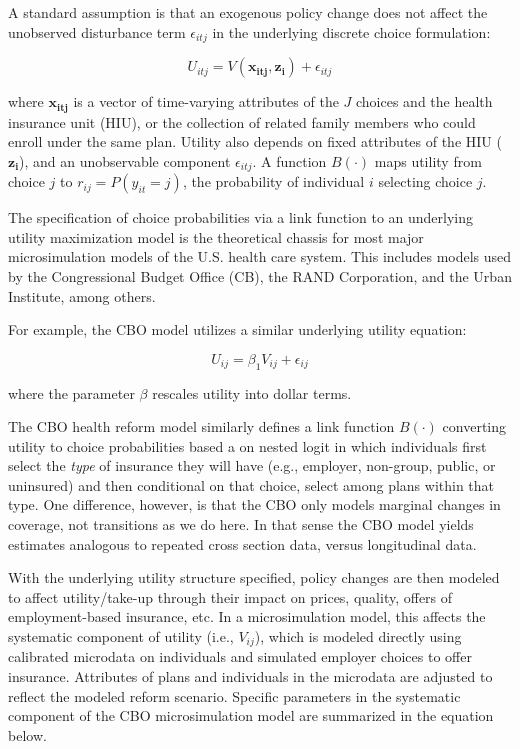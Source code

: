 \documentclass[
  10pt,
]{article}
\begin{document}
A standard assumption is that an exogenous policy change does not affect
the unobserved disturbance term \(\epsilon_{itj}\) in the underlying
discrete choice formulation:

\begin{equation}
\label{eq:utility_1}
U_{itj} = V(\mathbf{x_{itj}}, \mathbf{z_i})+ \epsilon_{itj}
\end{equation}

\noindent where \(\mathbf{x_{itj}}\) is a vector of time-varying
attributes of the \(J\) choices and the health insurance unit (HIU), or
the collection of related family members who could enroll under the same
plan. Utility also depends on fixed attributes of the HIU
(\(\mathbf{z_i}\)), and an unobservable component \(\epsilon_{itj}\). A
function \(B(\cdot)\) maps utility from choice \(j\) to
\(r_{ij} = P(y_{it} = j)\), the probability of individual \(i\)
selecting choice \(j\).

The specification of choice probabilities via a link function to an
underlying utility maximization model is the theoretical chassis for
most major microsimulation models of the U.S. health care system. This
includes models used by the Congressional Budget Office (CB), the RAND
Corporation, and the Urban Institute, among others.

For example, the CBO model utilizes a similar underlying utility
equation:

\begin{equation}
\label{eq:utility_cbo}
U_{ij} = \beta_1 V_{ij} + \epsilon_{ij}
\end{equation}

\noindent where the parameter \(\beta\) rescales utility into dollar
terms.

The CBO health reform model similarly defines a link function
\(B(\cdot)\) converting utility to choice probabilities based a on
nested logit in which individuals first select the \emph{type} of
insurance they will have (e.g., employer, non-group, public, or
uninsured) and then conditional on that choice, select among plans
within that type. One difference, however, is that the CBO only models
marginal changes in coverage, not transitions as we do here. In that
sense the CBO model yields estimates analogous to repeated cross section
data, versus longitudinal data.

With the underlying utility structure specified, policy changes are then
modeled to affect utility/take-up through their impact on prices,
quality, offers of employment-based insurance, etc. In a microsimulation
model, this affects the systematic component of utility (i.e.,
\(V_{ij}\)), which is modeled directly using calibrated microdata on
individuals and simulated employer choices to offer insurance.
Attributes of plans and individuals in the microdata are adjusted to
reflect the modeled reform scenario. Specific parameters in the
systematic component of the CBO microsimulation model are summarized in
the equation below.
\end{document}
